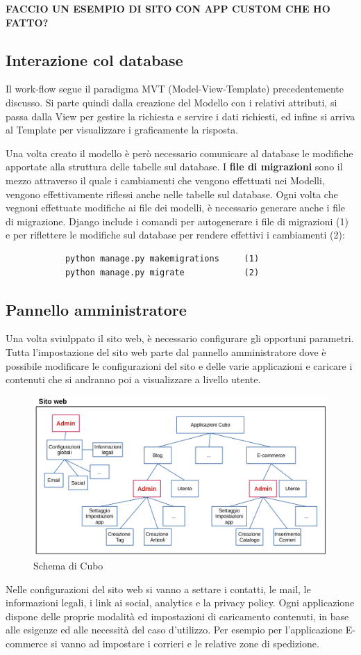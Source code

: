 \documentclass[12pt,a4paper]{article}
\begin{document}
\textbf{FACCIO UN ESEMPIO DI SITO CON APP CUSTOM CHE HO FATTO?}

\subsection{Interazione col database}
Il work-flow segue il paradigma MVT (Model-View-Template) precedentemente discusso. Si parte quindi dalla creazione del Modello con i relativi attributi, si passa dalla View per gestire la richiesta e servire i dati richiesti, ed infine si arriva al Template per visualizzare i graficamente la risposta.

Una volta creato il modello è però necessario comunicare al database le modifiche apportate alla struttura delle tabelle sul database.
I \textbf{file di migrazioni} sono il mezzo attraverso il quale i cambiamenti che vengono effettuati nei Modelli, vengono effettivamente riflessi anche nelle tabelle sul database.
Ogni volta che vegnoni effettuate modifiche ai file dei modelli, è necessario generare anche i file di migrazione. Django include i comandi per autogenerare i file di migrazioni (1) e per riflettere le modifiche sul database per rendere effettivi i cambiamenti (2):
\begin{verbatim}
            python manage.py makemigrations     (1)
            python manage.py migrate            (2)
\end{verbatim}

\subsection{Pannello amministratore}
Una volta sviulppato il sito web, è necessario configurare gli opportuni parametri. Tutta l'impostazione del sito web parte dal pannello amministratore dove è possibile modificare le configurazioni del sito e delle varie applicazioni e caricare i contenuti che si andranno poi a visualizzare a livello utente.
\begin{figure}[H]
    \centering
    \includegraphics[width=1\linewidth]{admin.png}
    \caption{Schema di Cubo}
\end{figure}
Nelle configurazioni del sito web si vanno a settare i contatti, le mail, le informazioni legali, i link ai social, analytics e la privacy policy.
Ogni applicazione dispone delle proprie modalità ed impostazioni di caricamento contenuti, in base alle esigenze ed alle necessità del caso d'utilizzo. Per esempio per l'applicazione E-commerce si vanno ad impostare i corrieri e le relative zone di spedizione.
\end{document}
